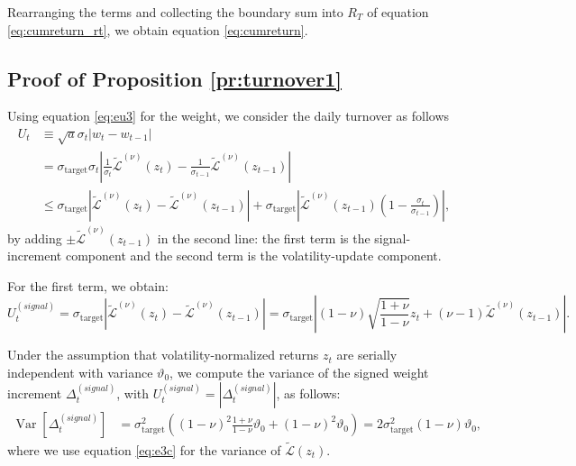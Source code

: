 \documentclass[hidelinks]{siamonline250211}
\DeclareMathOperator{\Var}{Var}
\begin{document}
Rearranging the terms and collecting the boundary sum into $R_{T}$ of equation \eqref{eq:cumreturn_rt}, we obtain equation \eqref{eq:cumreturn}.



\subsection{Proof of Proposition \ref{pr:turnover1}}\label{sec:ta1}


Using equation \eqref{eq:eu3} for the weight, we consider the daily turnover as follows
\begin{equation} \label{eq:tur3}  
	\begin{split}
		U_{t} &  \equiv \sqrt{a}\sigma_{t}\left| w_{t} -  w_{t-1}\right| \\
		& = \sigma_{\mathrm{target}}\sigma_{t}\left|  \frac{1}{\sigma_{t}}\tilde{\mathcal{L}}^{(\nu)} (z_{t}) -  \frac{1}{\sigma_{t-1}}\tilde{\mathcal{L}}^{(\nu)} (z_{t-1})   \right| \\
		& \leq  \sigma_{\mathrm{target}}\left|  \tilde{\mathcal{L}}^{(\nu)} (z_{t}) - \tilde{\mathcal{L}}^{(\nu)} (z_{t-1})   \right| +  \sigma_{\mathrm{target}}\left| \tilde{\mathcal{L}}^{(\nu)} (z_{t-1}) \left(1 -  \frac{\sigma_{t}}{\sigma_{t-1}} \right)  \right|,
	\end{split}
\end{equation}
by adding $\pm \tilde{\mathcal{L}}^{(\nu)} (z_{t-1})$ in the second line: the first term is the signal-increment component and the second term is the volatility-update component.

For the first term, we obtain:
\begin{equation} \label{eq:tur4}  
	U^{(signal)}_{t}  = \sigma_{\mathrm{target}}\left|  \tilde{\mathcal{L}}^{(\nu)} (z_{t}) -  \tilde{\mathcal{L}}^{(\nu)} (z_{t-1})   \right| = \sigma_{\mathrm{target}}  \left|  (1-\nu)\sqrt{ \frac{ 1+\nu}{ 1-\nu} }z_{t}  + (\nu -1)\tilde{\mathcal{L}}^{(\nu)} (z_{t-1})  \right|. 
\end{equation}

Under the assumption that volatility-normalized returns $z_{t}$ are serially independent with variance $\vartheta_{0}$, we compute the variance of the signed weight increment $\Delta^{(signal)}_{t}$, with $U^{(signal)}_{t} = |\Delta^{(signal)}_{t}|$, as follows:
\begin{equation} \label{eq:tur5}  
	\begin{split}
		\Var \left[ \Delta^{(signal)}_{t}  \right] & =\sigma^{2}_{\mathrm{target}}  \left(  (1-\nu)^{2}\frac{ 1+\nu}{ 1-\nu} \vartheta_{0}  + (1-\nu)^{2}  \vartheta_{0} \right) =  2 \sigma^{2}_{\mathrm{target}}  \left(  1-\nu \right)   \vartheta_{0},
	\end{split}
\end{equation}
where we use equation \eqref{eq:e3c} for the variance of $\tilde{\mathcal{L}}(z_{t})$.
\end{document}
